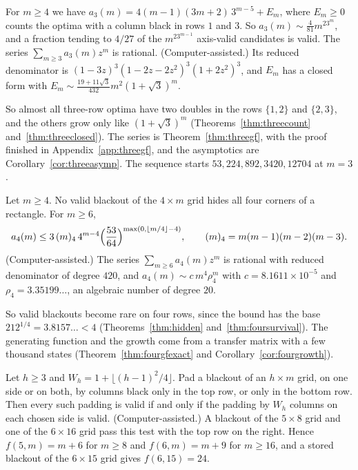 \begin{thmB}
For $m\ge4$ we have $a_3(m)=4(m-1)(3m+2)\,3^{m-5}+E_m$, where $E_m\ge0$ counts the optima
with a column black in rows $1$ and $3$. So $a_3(m)\sim\frac4{81}m^23^m$, and a fraction
tending to $4/27$ of the $m^23^{m-1}$ axis-valid candidates is valid. The series
$\sum_{m\ge3}a_3(m)z^m$ is rational. (Computer-assisted.) Its reduced denominator is
$(1-3z)^3(1-2z-2z^2)^3(1+2z^2)^3$, and $E_m$ has a closed form with
$E_m\sim\frac{19+11\sqrt3}{432}m^2(1+\sqrt3)^m$.
\end{thmB}

So almost all three-row optima have two doubles in the rows $\{1,2\}$ and $\{2,3\}$, and
the others grow only like $(1+\sqrt3)^m$ (Theorems~\ref{thm:threecount}
and~\ref{thm:threeclosed}). The series is Theorem~\ref{thm:threegf}, with the proof
finished in Appendix~\ref{app:threegf}, and the asymptotics are
Corollary~\ref{cor:threeasymp}. The sequence starts $53,224,892,3420,12704$ at $m=3$.

\begin{thmC}
Let $m\ge4$. No valid blackout of the $4\times m$ grid hides all four corners of a
rectangle. For $m\ge6$,
\[
a_4(m)\le3\,(m)_4\,4^{m-4}\Bigl(\frac{53}{64}\Bigr)^{\max(0,\lfloor m/4\rfloor-4)},
\qquad (m)_4=m(m-1)(m-2)(m-3).
\]
(Computer-assisted.) The series $\sum_{m\ge6}a_4(m)z^m$ is rational with reduced
denominator of degree $420$, and $a_4(m)\sim c\,m^4\rho_4^m$ with $c=8.1611\times10^{-5}$
and $\rho_4=3.35199\ldots$, an algebraic number of degree $20$.
\end{thmC}

So valid blackouts become rare on four rows, since the bound has the base
$212^{1/4}=3.8157\ldots<4$ (Theorems~\ref{thm:hidden} and~\ref{thm:foursurvival}). The
generating function and the growth come from a transfer matrix with a few thousand states
(Theorem~\ref{thm:fourgfexact} and Corollary~\ref{cor:fourgrowth}).


\begin{thmD}
Let $h\ge3$ and $W_h=1+\lfloor(h-1)^2/4\rfloor$. Pad a blackout of an $h\times m$ grid, on
one side or on both, by columns black only in the top row, or only in the bottom row.
Then every such padding is valid if and only if the padding by $W_h$ columns on each
chosen side is valid. (Computer-assisted.) A blackout of the $5\times8$ grid and one of the
$6\times16$ grid pass this test with the top row on the right. Hence $f(5,m)=m+6$ for
$m\ge8$ and $f(6,m)=m+9$ for $m\ge16$, and a stored blackout of the $6\times15$ grid gives
$f(6,15)=24$.
\end{thmD}

